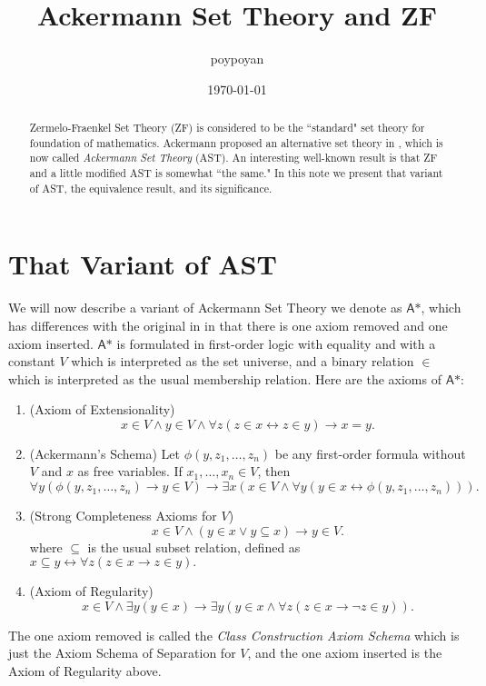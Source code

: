 \documentclass{article}
\title{Ackermann Set Theory and ZF}
\author{poypoyan}
\date{\petsa\today}
\begin{document}
\maketitle

\begin{abstract}
Zermelo-Fraenkel Set Theory (ZF) is considered to be the ``standard" set theory for foundation of mathematics. Ackermann proposed an alternative set theory in \cite{ackermann}, which is now called \textit{Ackermann Set Theory} (AST). An interesting well-known result is that ZF and a little modified AST is somewhat ``the same." In this note we present that variant of AST, the equivalence result, and its significance.
\end{abstract}

\section{That Variant of AST}
We will now describe a variant of Ackermann Set Theory we denote as $\textsf{A*}$, which has differences with the original in \cite{ackermann} in that there is one axiom removed and one axiom inserted. $\textsf{A*}$ is formulated in first-order logic with equality and with a constant $V$ which is interpreted as the set universe, and a binary relation $\in$ which is interpreted as the usual membership relation. Here are the axioms of $\textsf{A*}$:
\begin{enumerate}
	\item (Axiom of Extensionality) $$x \in V \wedge y \in V \wedge \forall z(z\in x \leftrightarrow z \in y) \rightarrow x = y.$$
	\item (Ackermann's Schema) Let $\phi(y, z_1, \ldots, z_n)$ be any first-order formula without $V$ and $x$ as free variables. If $x_1, \ldots, x_n \in V$, then $$\forall y(\phi(y, z_1, \ldots, z_n) \rightarrow y \in V) \rightarrow \exists x(x \in V \wedge \forall y(y \in x \leftrightarrow \phi(y, z_1, \ldots, z_n))).$$
	\item (Strong Completeness Axioms for $V$) $$x \in V \wedge (y \in x \vee y \subseteq x) \rightarrow y \in V.$$ where $\subseteq$ is the usual subset relation, defined as $x \subseteq y \leftrightarrow \forall z(z \in x \rightarrow z \in y).$
	\item (Axiom of Regularity) $$x \in V \wedge \exists y(y \in x) \rightarrow \exists y(y \in x \wedge \forall z(z \in x \rightarrow \neg z \in y)).$$
\end{enumerate}
The one axiom removed is called the \textit{Class Construction Axiom Schema} which is just the Axiom Schema of Separation for $V$, and the one axiom inserted is the Axiom of Regularity above.
\end{document}

